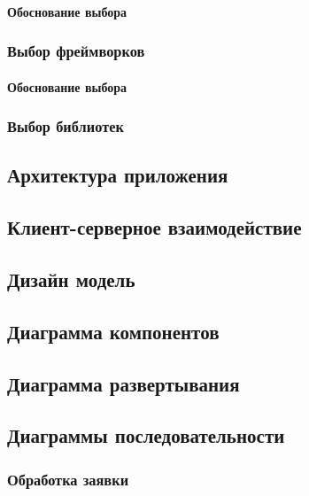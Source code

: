 \documentclass[a4paper,12pt,reqno]{article}
\begin{document}
\paragraph*{Обоснование выбора\\}


\subsubsection{Выбор фреймворков}

\paragraph*{Обоснование выбора\\}

\subsubsection{Выбор библиотек} \label{sec: libr}


\subsection{Архитектура приложения}

\subsection{Клиент-серверное взаимодействие}


\subsection{Дизайн модель}

\subsection{Диаграмма компонентов}



\subsection{Диаграмма развертывания}

\subsection{Диаграммы последовательности}

\subsubsection{Обработка заявки} \label{sec: sequence_status}
\end{document}
